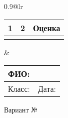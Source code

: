 \begin{tabular*}{0.9\textwidth}{@{\extracolsep{\fill}}lr}

\begin{tabular}{|c|c|c|}
\hline
1 & 2 & Оценка \\
\hline
  &   &        \\
\hline
\end{tabular}
 
&

\begin{tabular}{|l|l|}
\hline
\multicolumn{2}{|l|}{ФИО:} \\
\hline
Класс:  \hspace{1cm} &  Дата: \testdate \\
\hline
\end{tabular}


\end{tabular*} 


\begin{center}
 \large 

Вариант № \varnum

\testtitle


\end{center}
